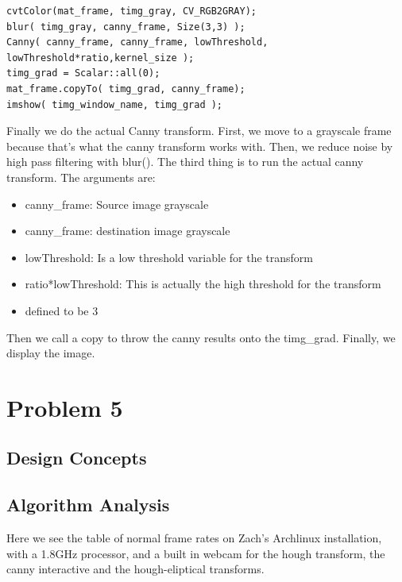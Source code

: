 \documentclass{article}
\begin{document}
\begin{lstlisting}
cvtColor(mat_frame, timg_gray, CV_RGB2GRAY);
blur( timg_gray, canny_frame, Size(3,3) );
Canny( canny_frame, canny_frame, lowThreshold, lowThreshold*ratio,kernel_size );
timg_grad = Scalar::all(0);
mat_frame.copyTo( timg_grad, canny_frame);
imshow( timg_window_name, timg_grad );
\end{lstlisting}
Finally we do the actual Canny transform. First, we move to a grayscale frame because that's what the canny transform works with. Then, we reduce noise by high pass filtering with blur(). The third thing is to run the actual canny transform. The arguments are:
\begin{itemize}
    \item canny\_frame: Source image grayscale
    \item canny\_frame: destination image grayscale
    \item lowThreshold: Is a low threshold variable for the transform
    \item ratio*lowThreshold: This is actually the high threshold for the transform
    \item defined to be 3
\end{itemize}
Then we call a copy to throw the canny results onto the timg\_grad. Finally, we display the image.


\section*{Problem 5}
\subsection*{Design Concepts}

\subsection*{Algorithm Analysis}
Here we see the table of normal frame rates on Zach's Archlinux installation, with a 1.8GHz processor, and a built in webcam for the hough transform, the canny interactive and the hough-eliptical transforms.
\end{document}
